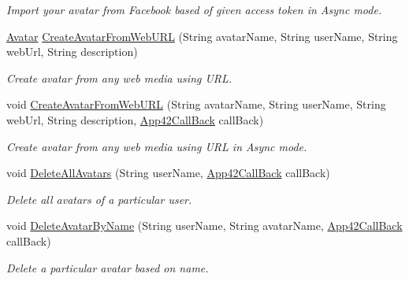 \begin{DoxyCompactItemize}
\begin{DoxyCompactList}\small\item\em Import your avatar from Facebook based of given access token in Async mode. \end{DoxyCompactList}\item 
\hyperlink{classcom_1_1shephertz_1_1app42_1_1paas_1_1sdk_1_1csharp_1_1avatar_1_1_avatar}{Avatar} \hyperlink{classcom_1_1shephertz_1_1app42_1_1paas_1_1sdk_1_1csharp_1_1avatar_1_1_avatar_service_a3b6e8129db47a2053fc96c1647ddf025}{Create\+Avatar\+From\+Web\+U\+R\+L} (String avatar\+Name, String user\+Name, String web\+Url, String description)
\begin{DoxyCompactList}\small\item\em Create avatar from any web media using U\+R\+L. \end{DoxyCompactList}\item 
void \hyperlink{classcom_1_1shephertz_1_1app42_1_1paas_1_1sdk_1_1csharp_1_1avatar_1_1_avatar_service_ae5f18e2cc50a7d88efefee5b0bd54b64}{Create\+Avatar\+From\+Web\+U\+R\+L} (String avatar\+Name, String user\+Name, String web\+Url, String description, \hyperlink{interfacecom_1_1shephertz_1_1app42_1_1paas_1_1sdk_1_1csharp_1_1_app42_call_back}{App42\+Call\+Back} call\+Back)
\begin{DoxyCompactList}\small\item\em Create avatar from any web media using U\+R\+L in Async mode. \end{DoxyCompactList}\item 
void \hyperlink{classcom_1_1shephertz_1_1app42_1_1paas_1_1sdk_1_1csharp_1_1avatar_1_1_avatar_service_ada5b57bc54cc6a3be19529b5f6d049d5}{Delete\+All\+Avatars} (String user\+Name, \hyperlink{interfacecom_1_1shephertz_1_1app42_1_1paas_1_1sdk_1_1csharp_1_1_app42_call_back}{App42\+Call\+Back} call\+Back)
\begin{DoxyCompactList}\small\item\em Delete all avatars of a particular user. \end{DoxyCompactList}\item 
void \hyperlink{classcom_1_1shephertz_1_1app42_1_1paas_1_1sdk_1_1csharp_1_1avatar_1_1_avatar_service_a62d576249116ba6e3ec38391aeff9a06}{Delete\+Avatar\+By\+Name} (String user\+Name, String avatar\+Name, \hyperlink{interfacecom_1_1shephertz_1_1app42_1_1paas_1_1sdk_1_1csharp_1_1_app42_call_back}{App42\+Call\+Back} call\+Back)
\begin{DoxyCompactList}\small\item\em Delete a particular avatar based on name. \end{DoxyCompactList}\item 

\end{DoxyCompactItemize}
